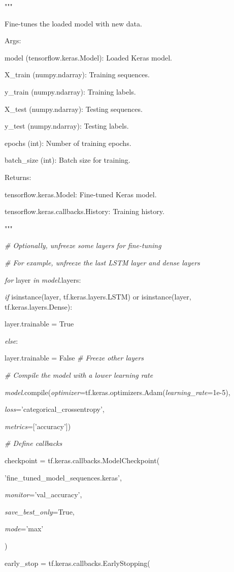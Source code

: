 \documentclass[
]{article}
\begin{document}
"""

Fine-tunes the loaded model with new data.

Args:

model (tensorflow.keras.Model): Loaded Keras model.

X\_train (numpy.ndarray): Training sequences.

y\_train (numpy.ndarray): Training labels.

X\_test (numpy.ndarray): Testing sequences.

y\_test (numpy.ndarray): Testing labels.

epochs (int): Number of training epochs.

batch\_size (int): Batch size for training.

Returns:

tensorflow.keras.Model: Fine-tuned Keras model.

tensorflow.keras.callbacks.History: Training history.

"""

\emph{\# Optionally, unfreeze some layers for fine-tuning}

\emph{\# For example, unfreeze the last LSTM layer and dense layers}

\emph{for} layer \emph{in} \emph{model}.layers:

\emph{if} isinstance(layer, tf.keras.layers.LSTM) or isinstance(layer, tf.keras.layers.Dense):

layer.trainable = True

\emph{else}:

layer.trainable = False \emph{\# Freeze other layers}

\emph{\# Compile the model with a lower learning rate}

\emph{model}.compile(\emph{optimizer}=tf.keras.optimizers.Adam(\emph{learning\_rate}=1e-5),

\emph{loss}='categorical\_crossentropy',

\emph{metrics}={[}'accuracy'{]})

\emph{\# Define callbacks}

checkpoint = tf.keras.callbacks.ModelCheckpoint(

'fine\_tuned\_model\_sequences.keras',

\emph{monitor}='val\_accuracy',

\emph{save\_best\_only}=True,

\emph{mode}='max'

)

early\_stop = tf.keras.callbacks.EarlyStopping(
\end{document}
